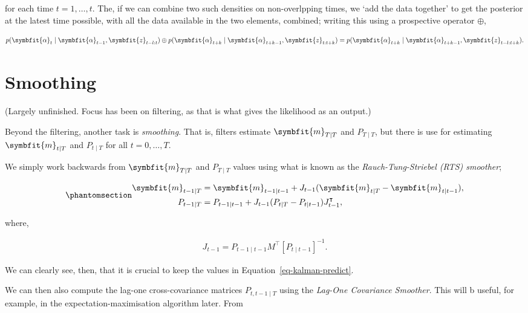 \documentclass[
]{report}
\newcommand{\bv}[1]{\symbfit{#1}}
\theoremstyle{plain}
\theoremstyle{plain}
\theoremstyle{remark}
\begin{document}
for each time \(t=1,\dots, t\). The, if we can combine two such
densities on non-overlpping times, we `add the data together' to get the
posterior at the latest time possible, with all the data available in
the two elements, combined; writing this using a prospective operator
\(\oplus\),

\[\begin{split}
  p(\bv\alpha_t \mid \bv\alpha_{t-1}, \bv z_{t-l:t}) \oplus p(\bv\alpha_{t+k} \mid \bv\alpha_{t+k-1}, \bv z_{t:t+k}) = p(\bv\alpha_{t+k} \mid \bv\alpha_{t+k-1}, \bv z_{t-l:t+k}).
\end{split}
\]

\section{Smoothing}\label{smoothing}

(Largely unfinished. Focus has been on filtering, as that is what gives
the likelihood as an output.)

Beyond the filtering, another task is \emph{smoothing}. That is, filters
estimate \(\bv m_{T\mid T}\) and \(P_{T\mid T}\), but there is use for
estimating \(\bv m_{t\mid T}\) and \(P_{t\mid T}\) for all
\(t=0,\dots, T\).

We simply work backwards from \(\bv m_{T\mid T}\) and \(P_{T\mid T}\)
values using what is known as the \emph{Rauch-Tung-Striebel (RTS)
smoother};

\begin{equation}\phantomsection\label{eq-kalmansmooth}{\begin{split}
\bv m_{t-1\mid T} &= \bv m_{t-1\mid t-1} + J_{t-1}(\bv m_{t\mid T} - \bv m_{t\mid t-1}),\\
P_{t-1\mid T} &= P_{t-1\mid t-1} + J_{t-1}(P_{t\mid T} - P_{t\mid t-1})J_{t-1}^\intercal,
\end{split}
}\end{equation}

where,

\[\begin{split}
J_{t-1} = P_{t-1\mid t-1}M^\intercal[P_{t\mid t-1}]^{-1}.
\end{split}
\]

We can clearly see, then, that it is crucial to keep the values in
Equation~\ref{eq-kalman-predict}.

We can then also compute the lag-one cross-covariance matrices
\(P_{t,t-1\mid T}\) using the \emph{Lag-One Covariance Smoother}. This
will b useful, for example, in the expectation-maximisation algorithm
later. From
\end{document}
